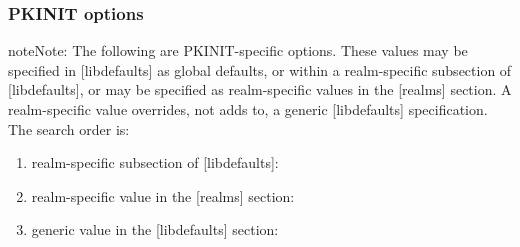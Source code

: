 \documentclass[letterpaper,10pt,english]{sphinxmanual}
\begin{document}
\subsubsection{PKINIT options}
\label{\detokenize{admin/conf_files/krb5_conf:pkinit-options}}
\begin{sphinxadmonition}{note}{Note:}
The following are PKINIT-specific options.  These values may
be specified in {[}libdefaults{]} as global defaults, or within
a realm-specific subsection of {[}libdefaults{]}, or may be
specified as realm-specific values in the {[}realms{]} section.
A realm-specific value overrides, not adds to, a generic
{[}libdefaults{]} specification.  The search order is:
\end{sphinxadmonition}
\begin{enumerate}
\item {} 
realm-specific subsection of {[}libdefaults{]}:

%
\begin{sphinxVerbatim}[commandchars=\\\{\}]
\PYG{p}{[}\PYG{p}{]}
      
          
\end{sphinxVerbatim}

\item {} 
realm-specific value in the {[}realms{]} section:

%
\begin{sphinxVerbatim}[commandchars=\\\{\}]
\PYG{p}{[}\PYG{p}{]}
      
          
\end{sphinxVerbatim}

\item {} 
generic value in the {[}libdefaults{]} section:

%
\begin{sphinxVerbatim}[commandchars=\\\{\}]
\PYG{p}{[}\PYG{p}{]}
      
\end{sphinxVerbatim}

\end{enumerate}
\end{document}
